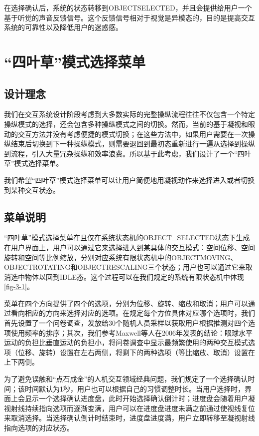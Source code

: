 在选择确认后，系统的状态转移到OBJECT\us SELECTED，并且会提供给用户一个基于听觉的声音反馈信号。这个反馈信号相对于视觉是异模态的，目的是提高交互系统的可靠性以及降低用户的迷惑感。

\section{“四叶草”模式选择菜单}\label{Clover}

\subsection{设计理念}

我们在交互系统设计阶段考虑到大多数实际的完整操纵流程往往不仅包含一个特定操纵模式的选择，还会包含多种操纵模式之间的切换。然而，当前的基于凝视和眼动的交互方法并没有考虑便捷的模式切换；在这些方法中，如果用户需要在一次操纵结束后切换到下一种操纵模式，则需要退回到最初态重新进行一遍从选择到操纵到流程，引入大量冗杂操纵和效率浪费。所以基于此考虑，我们设计了一个“四叶草”模式选择菜单。

我们希望“四叶草”模式选择菜单可以让用户简便地用凝视动作来选择进入或者切换到某种交互状态。

\subsection{菜单说明}

“四叶草”模式选择菜单在且仅在系统状态机的OBJECT_SELECTED状态下生成在用户界面上，用户可以通过它来选择进入到某具体的交互模式：空间位移、空间旋转和空间等比例缩放，分别对应系统有限状态机中的OBJECT\us MOVING、OBJECT\us ROTATING和OBJECT\us RESCALING三个状态；用户也可以通过它来取消选中物体以回到IDLE态。这个过程可以在我们规定的系统有限状态机中体现\ref{fig-3-1}。

菜单在四个方向提供了四个的选项，分别为位移、旋转、缩放和取消；用户可以通过看向相应的方向来选择对应的选项。在规定每个方位具体对应哪个选项时，我们首先设置了一个问卷调查，发放给30个随机人员采样以获取用户根据推测对四个选项使用频率的排序；其次，我们参考Maxwell等人在2006年发表的结论：眼球水平运动的负担比垂直运动的负担小，将问卷调查中显示最频繁使用的两种交互模式选项（位移、旋转）设置在左右两侧，将剩下的两种选项（等比缩放、取消）设置在上下两侧。

为了避免误触和“点石成金”的人机交互领域经典问题，我们规定了一个选择确认时间；该时间默认为1秒，用户也可以根据自己的习惯调整时长。当用户选择时，界面上会显示一个选择确认进度盘，此时开始选择确认倒计时；进度盘会随着用户凝视射线持续指向选项而逐渐变满，用户可以在进度盘进度未满之前通过使视线复位来取消选择。当选择确认倒计时结束时，进度盘进度满，用户立即转移至凝视射线指向选项的对应状态。


